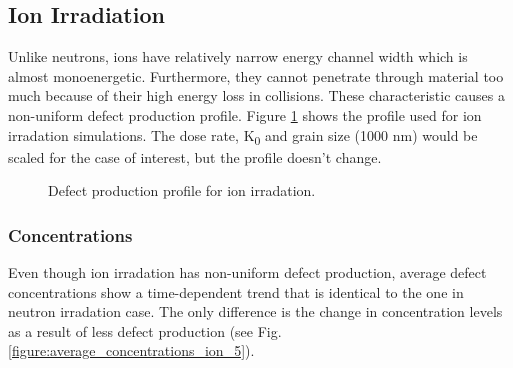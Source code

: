 \documentclass[a4paper]{article}
\begin{document}
  \newpage
  \subsection{Ion Irradiation} \hspace{10pt}
  Unlike neutrons, ions have relatively narrow energy channel width which is almost monoenergetic. Furthermore, they cannot penetrate through material too much because of their high energy loss in collisions. These characteristic causes a non-uniform defect production profile. Figure \ref{figure:defect_production} shows the profile used for ion irradation simulations. The dose rate, K\textsubscript{0} and grain size (1000 nm) would be scaled for the case of interest, but the profile doesn't change.
    \begin{figure}[h!]  %
      \centering
      \qquad
      \caption{Defect production profile for ion irradation.}
      \label{figure:defect_production}
    \end{figure}
    \newpage
    \subsubsection{Concentrations} \hspace{10pt}
    Even though ion irradation has non-uniform defect production, average defect concentrations show a time-dependent trend that is identical to the one in neutron irradation case. The only difference is the change in concentration levels as a result of less defect production (see Fig. \ref{figure:average_concentrations_ion_5}).
\end{document}
